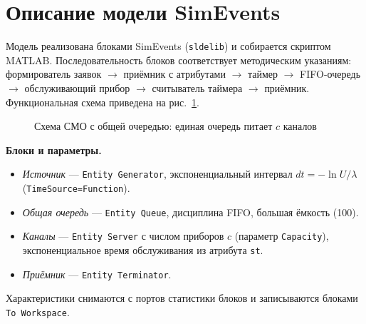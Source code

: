 \documentclass[a4paper,14pt,oneside,openany]{memoir}
\begin{document}
\section{Описание модели SimEvents}

Модель реализована блоками SimEvents (\texttt{sldelib}) и собирается скриптом MATLAB. Последовательность блоков соответствует методическим указаниям: формирователь заявок $\to$ приёмник с атрибутами $\to$ таймер $\to$ FIFO-очередь $\to$ обслуживающий прибор $\to$ считыватель таймера $\to$ приёмник. Функциональная схема приведена на рис.~\ref{fig:lab10_scheme}.

\begin{figure}[H]
\centering
{}
\caption{Схема СМО с общей очередью: единая очередь питает $c$ каналов}
\label{fig:lab10_scheme}
\end{figure}

\textbf{Блоки и параметры.}
\begin{itemize}
    \item \textit{Источник} --- \texttt{Entity Generator}, экспоненциальный интервал $dt=-\ln U/\lambda$ (\texttt{TimeSource=Function}).
    \item \textit{Общая очередь} --- \texttt{Entity Queue}, дисциплина FIFO, большая ёмкость (100).
    \item \textit{Каналы} --- \texttt{Entity Server} с числом приборов $c$ (параметр \texttt{Capacity}), экспоненциальное время обслуживания из атрибута \texttt{st}.
    \item \textit{Приёмник} --- \texttt{Entity Terminator}.
\end{itemize}
Характеристики снимаются с портов статистики блоков и записываются блоками \texttt{To Workspace}.
\end{document}
